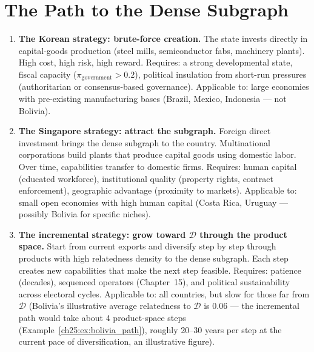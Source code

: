 \documentclass[../structural_economics_book.tex]{subfiles}
\begin{document}
\section{The Path to the Dense Subgraph}
\label{ch25:sec:path}

\begin{remark}\label{ch25:prop:strategies}
\begin{enumerate}
\item \textbf{The Korean strategy: brute-force creation.} The state invests directly in capital-goods production (steel mills, semiconductor fabs, machinery plants). High cost, high risk, high reward. Requires: a strong developmental state, fiscal capacity ($\pi_{\text{government}} > 0.2$), political insulation from short-run pressures (authoritarian or consensus-based governance). Applicable to: large economies with pre-existing manufacturing bases (Brazil, Mexico, Indonesia --- not Bolivia).

\item \textbf{The Singapore strategy: attract the subgraph.} Foreign direct investment brings the dense subgraph to the country. Multinational corporations build plants that produce capital goods using domestic labor. Over time, capabilities transfer to domestic firms. Requires: human capital (educated workforce), institutional quality (property rights, contract enforcement), geographic advantage (proximity to markets). Applicable to: small open economies with high human capital (Costa Rica, Uruguay --- possibly Bolivia for specific niches).

\item \textbf{The incremental strategy: grow toward $\mathcal{D}$ through the product space.} Start from current exports and diversify step by step through products with high relatedness density to the dense subgraph. Each step creates new capabilities that make the next step feasible. Requires: patience (decades), sequenced operators (Chapter~15), and political sustainability across electoral cycles. Applicable to: all countries, but slow for those far from $\mathcal{D}$ (Bolivia's illustrative average relatedness to $\mathcal{D}$ is 0.06 --- the incremental path would take about 4 product-space steps (Example~\ref{ch25:ex:bolivia_path}), roughly 20--30 years per step at the current pace of diversification, an illustrative figure).
\end{enumerate}
\end{remark}
\end{document}
